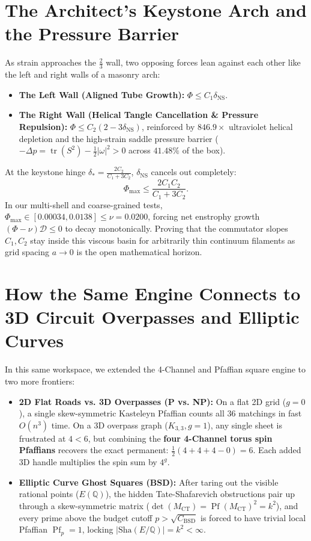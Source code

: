 \documentclass[11pt,a4paper]{article}
\providecommand{\Sha}{\mathrm{Sha}}
\theoremstyle{definition}
\begin{document}
\section{The Architect's Keystone Arch and the Pressure Barrier}
As strain approaches the $\frac{2}{3}$ wall, two opposing forces lean against each other like the left and right walls of a masonry arch:
\begin{itemize}
  \item \textbf{The Left Wall (Aligned Tube Growth):} $\Phi \le C_1 \delta_{\mathrm{NS}}$.
  \item \textbf{The Right Wall (Helical Tangle Cancellation \& Pressure Repulsion):} $\Phi \le C_2(2 - 3\delta_{\mathrm{NS}})$, reinforced by $846.9\times$ ultraviolet helical depletion and the high-strain saddle pressure barrier ($-\Delta p = \operatorname{tr}(S^2) - \frac{1}{2}|\omega|^2 > 0$ across $41.48\%$ of the box).
\end{itemize}
At the keystone hinge $\delta_* = \frac{2C_2}{C_1 + 3C_2}$, $\delta_{\mathrm{NS}}$ cancels out completely:
\begin{equation}
\Phi_{\max} \le \frac{2 C_1 C_2}{C_1 + 3 C_2}.
\end{equation}
In our multi-shell and coarse-grained tests, $\Phi_{\max} \in [0.00034, 0.0138] \le \nu = 0.0200$, forcing net enstrophy growth $(\Phi - \nu)\mathcal{D} \le 0$ to decay monotonically. Proving that the commutator slopes $C_1, C_2$ stay inside this viscous basin for arbitrarily thin continuum filaments as grid spacing $a \to 0$ is the open mathematical horizon.

\section{How the Same Engine Connects to 3D Circuit Overpasses and Elliptic Curves}
In this same workspace, we extended the 4-Channel and Pfaffian square engine to two more frontiers:
\begin{itemize}
  \item \textbf{2D Flat Roads vs. 3D Overpasses (P vs. NP):} On a flat 2D grid ($g = 0$), a single skew-symmetric Kasteleyn Pfaffian counts all $36$ matchings in fast $O(n^3)$ time. On a 3D overpass graph ($K_{3,3}, g = 1$), any single sheet is frustrated at $4 < 6$, but combining the \textbf{four 4-Channel torus spin Pfaffians} recovers the exact permanent: $\frac{1}{2}(4 + 4 + 4 - 0) = 6$. Each added 3D handle multiplies the spin sum by $4^g$.
  \item \textbf{Elliptic Curve Ghost Squares (BSD):} After taring out the visible rational points ($E(\mathbb{Q})$), the hidden Tate-Shafarevich obstructions pair up through a skew-symmetric matrix ($\det(M_{\mathrm{CT}}) = \operatorname{Pf}(M_{\mathrm{CT}})^2 = k^2$), and every prime above the budget cutoff $p > \sqrt{C_{\mathrm{BSD}}}$ is forced to have trivial local Pfaffian $\operatorname{Pf}_p = 1$, locking $|\Sha(E/\mathbb{Q})| = k^2 < \infty$.
\end{itemize}
\end{document}
